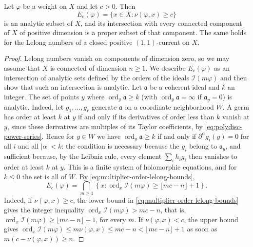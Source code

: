 \begin{theorem}[Siu]\label{thm:siu-lelong-level-sets}
Let $\varphi$ be a weight on $X$ and let $c>0$. Then
\[
 E_c(\varphi)=\{x\in X:\nu(\varphi,x)\geq c\}
\]
is an analytic subset of $X$, and its intersection with every connected component of $X$ of positive dimension is a proper subset of that component. The same holds for the Lelong numbers of a closed positive $(1,1)$-current on $X$.
\end{theorem}
\begin{proof}
Lelong numbers vanish on components of dimension zero, so we may assume that $X$ is connected of dimension $n\geq1$. We describe $E_c(\varphi)$ as an intersection of analytic sets defined by the orders of the ideals $\mathcal I(m\varphi)$ and then show that such an intersection is analytic. Let $\mathfrak a$ be a coherent ideal and $k$ an integer. The set of points $y$ where $\operatorname{ord}_y\mathfrak a\geq k$ (with $\operatorname{ord}_y\mathfrak a=\infty$ if $\mathfrak a_y=0$) is analytic. Indeed, let $g_1,\ldots,g_r$ generate $\mathfrak a$ on a coordinate neighborhood $W$. A germ has order at least $k$ at $y$ if and only if its derivatives of order less than $k$ vanish at $y$, since these derivatives are multiples of its Taylor coefficients, by \eqref{eq:polydisc-power-series}. Hence for $y\in W$ we have $\operatorname{ord}_y\mathfrak a\geq k$ if and only if $\partial^\alpha g_i(y)=0$ for all $i$ and all $|\alpha|<k$: the condition is necessary because the $g_i$ belong to $\mathfrak a_y$, and sufficient because, by the Leibniz rule, every element $\sum_ih_ig_i$ then vanishes to order at least $k$ at $y$. This is a finite system of holomorphic equations, and for $k\leq0$ the set is all of $W$. By \eqref{eq:multiplier-order-lelong-bounds},
\begin{equation}\label{eq:siu-as-jet-intersection}
 E_c(\varphi)=\bigcap_{m\geq1}
 \left\{x:\operatorname{ord}_x\mathcal I(m\varphi)
                          \geq\lfloor mc-n\rfloor+1\right\}.
\end{equation}
Indeed, if $\nu(\varphi,x)\geq c$, the lower bound in \eqref{eq:multiplier-order-lelong-bounds} gives the integer inequality $\operatorname{ord}_x\mathcal I(m\varphi)>mc-n$, that is, $\operatorname{ord}_x\mathcal I(m\varphi)\geq\lfloor mc-n\rfloor+1$, for every $m$. If $\nu(\varphi,x)<c$, the upper bound gives $\operatorname{ord}_x\mathcal I(m\varphi)\leq m\nu(\varphi,x)\leq mc-n<\lfloor mc-n\rfloor+1$ as soon as $m(c-\nu(\varphi,x))\geq n$.


\end{proof}
